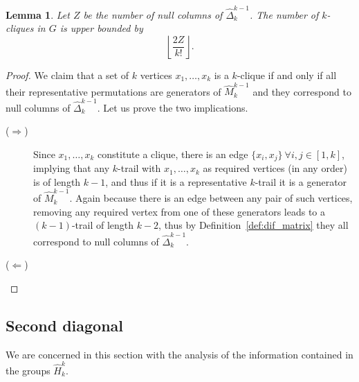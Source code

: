 \documentclass{article}
\newtheorem{lemma}{Lemma}
\begin{document}
	\begin{lemma}\label{lem:k_cliques}
		Let $Z$ be the number of null columns of $\widehat{\Delta}_k^{k-1}$. The number of $k$-cliques in $G$ is upper bounded by $$\left\lfloor\frac{2Z}{k!}\right\rfloor.$$
	\end{lemma}
	\begin{proof}
		We claim that a set of $k$ vertices $x_1,\ldots,x_k$ is a $k$-clique if and only if all their representative permutations are generators of $\widehat{M}_k^{k-1}$ and they correspond to null columns of $\widehat{\Delta}_k^{k-1}$. Let us prove the two implications.
		\begin{description}
			\item[($\Rightarrow$)] Since $x_1,\ldots,x_k$ constitute a clique, there is an edge $\{x_i,x_j\}~\forall i,j\in[1,k]$, implying that any $k$-trail with $x_1,\ldots,x_k$ as required vertices (in any order) is of length $k-1$, and thus if it is a representative $k$-trail it is a generator of $\widehat{M}_k^{k-1}$. Again because there is an edge between any pair of such vertices, removing any required vertex from one of these generators leads to a $(k-1)$-trail of length $k-2$, thus by Definition~\ref{def:dif_matrix} they all correspond to null columns of $\widehat{\Delta}_k^{k-1}$.
			\item[($\Leftarrow$)] 
		\end{description}
	\end{proof}
	
	
	\subsection{Second diagonal} %

We are concerned in this section with the analysis of the information contained in the groups $\widehat{H}_{k}^{k}$.
\end{document}

